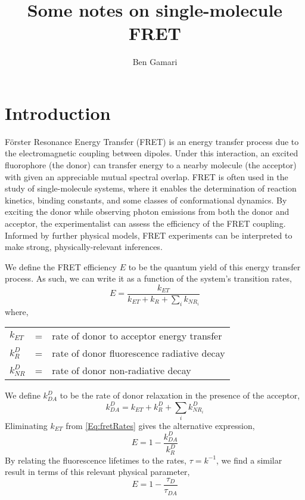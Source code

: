 \documentclass{article}
\title{Some notes on single-molecule FRET}
\author{Ben Gamari}
\newcommand{\NR}{\ensuremath{\mathit{NR}}}          %
\newcommand{\ET}{\ensuremath{\mathit{ET}}}          %
\begin{document}
\maketitle
\tableofcontents
\clearpage

\section{Introduction}
F\"orster Resonance Energy Transfer (FRET) is an energy transfer
process due to the electromagnetic coupling between dipoles. Under
this interaction, an excited fluorophore (the donor) can transfer energy
to a nearby molecule (the acceptor) with given an appreciable mutual
spectral overlap. FRET is often used in the study of single-molecule
systems, where it enables the determination of reaction kinetics,
binding constants, and some classes of conformational dynamics.
By exciting the donor while observing photon emissions from both the
donor and acceptor, the experimentalist can assess the efficiency of
the FRET coupling. Informed by further physical models, FRET
experiments can be interpreted to make strong, physically-relevant
inferences.

We define the FRET efficiency $E$ to be the quantum yield of this
energy transfer process. As such, we can write it as a function of the
system's transition rates,
\begin{equation}
  E = \frac{k_\ET}{k_\ET + k_R + \sum_i k_{\NR_i}}
  \label{Eq:fretRates}
\end{equation}
where,

\begin{tabular}{lcl}
  $k_\ET$     & = & rate of donor to acceptor energy transfer \\
  $k^D_R$     & = & rate of donor fluorescence radiative decay \\
  $k^D_\NR$   & = & rate of donor non-radiative decay \\
\end{tabular}

We define $k^D_{DA}$ to be the rate of donor relaxation in the presence
of the acceptor,
\[ k^D_{DA} = k_\ET + k^D_R + \sum_i k^D_{\NR_i} \]
Eliminating $k_\ET$ from \eqref{Eq:fretRates} gives the alternative expression,
\begin{equation}
  E = 1 - \frac{k^D_{DA}}{k^D_R} \label{Eq:fretEffRates}
\end{equation}
By relating the fluorescence lifetimes to the rates, $\tau = k^{-1}$,
we find a similar result in terms of this relevant physical parameter,
\begin{equation}
  E = 1 - \frac{\tau_D}{\tau_{DA}} \label{Eq:fretEffTau}
\end{equation}
\end{document}

